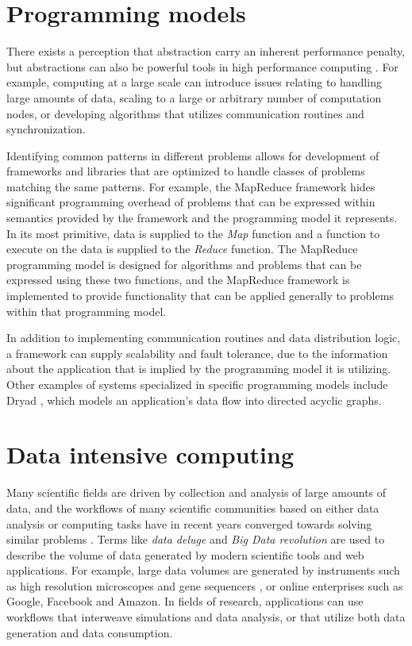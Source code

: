 \documentclass{uit-report}
\begin{document}
\section{Programming models}

There exists a perception that abstraction carry an inherent performance penalty, but abstractions can also be powerful tools in high performance computing \cite{mccandless_lumsdaine_1997}. For example, computing at a large scale can introduce issues relating to handling large amounts of data, scaling to a large or arbitrary number of computation nodes, or developing algorithms that utilizes communication routines and synchronization.

Identifying common patterns in different problems allows for development of frameworks and libraries that are optimized to handle classes of problems matching the same patterns. For example, the MapReduce framework hides significant programming overhead of problems that can be expressed within semantics provided by the framework and the programming model it represents. In its most primitive, data is supplied to the \emph{Map} function and a function to execute on the data is supplied to the \emph{Reduce} function. The MapReduce programming model is designed for algorithms and problems that can be expressed using these two functions, and the MapReduce framework is implemented to provide functionality that can be applied generally to problems within that programming model.

In addition to implementing communication routines and data distribution logic, a framework can supply scalability and fault tolerance, due to the information about the application that is implied by the programming model it is utilizing. Other examples of systems specialized in specific programming models include Dryad \cite{dryad}, which models an application's data flow into directed acyclic graphs.

\section{Data intensive computing}
Many scientific fields are driven by collection and analysis of large amounts of data, and the workflows of many scientific communities based on either data analysis or computing tasks have in recent years converged towards solving similar problems \cite{bigdataconvergence}. Terms like \emph{data deluge} and \emph{Big Data revolution} are used to describe the volume of data generated by modern scientific tools and web applications. For example, large data volumes are generated by instruments such as high resolution microscopes \cite{microscopy} and gene sequencers \cite{mapreduce_locality}, or online enterprises such as Google, Facebook and Amazon. In fields of research, applications can use workflows that interweave simulations and data analysis, or that utilize both data generation and data consumption. 
\end{document}
